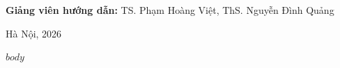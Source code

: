 \documentclass[a4paper,12pt]{report}
\begin{document}
\begin{titlepage}
\begin{center}
\vspace{0.8cm}

{\large\textbf{Giảng viên hướng dẫn:} TS. Phạm Hoàng Việt, ThS. Nguyễn Đình Quảng}

\vfill

{\large Hà Nội, 2026}

\end{center}
\end{titlepage}

\newpage
\begingroup
\setlength{\parskip}{0pt}
\linespread{1.0}\selectfont
\tableofcontents
\endgroup
\newpage

$body$
\end{document}
